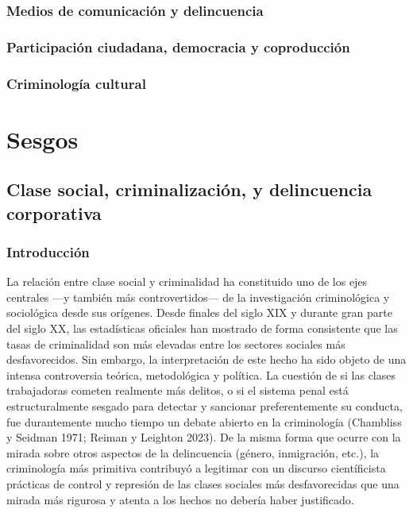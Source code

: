 \documentclass[
  spanish,
  letterpaper,
  DIV=11,
  numbers=noendperiod]{scrreprt}
\begin{document}
\section{Medios de comunicación y
delincuencia}\label{medios-de-comunicaciuxf3n-y-delincuencia}

\section{Participación ciudadana, democracia y
coproducción}\label{participaciuxf3n-ciudadana-democracia-y-coproducciuxf3n}

\section{Criminología cultural}\label{criminologuxeda-cultural}

\part{Sesgos}

\chapter{Clase social, criminalización, y delincuencia
corporativa}\label{clase-social-criminalizaciuxf3n-y-delincuencia-corporativa}

\section{Introducción}\label{introducciuxf3n-1}

La relación entre clase social y criminalidad ha constituido uno de los
ejes centrales ---y también más controvertidos--- de la investigación
criminológica y sociológica desde sus orígenes. Desde finales del siglo
XIX y durante gran parte del siglo XX, las estadísticas oficiales han
mostrado de forma consistente que las tasas de criminalidad son más
elevadas entre los sectores sociales más desfavorecidos. Sin embargo, la
interpretación de este hecho ha sido objeto de una intensa controversia
teórica, metodológica y política. La cuestión de si las clases
trabajadoras cometen realmente más delitos, o si el sistema penal está
estructuralmente sesgado para detectar y sancionar preferentemente su
conducta, fue durantemente mucho tiempo un debate abierto en la
criminología (Chambliss y Seidman 1971; Reiman y Leighton 2023). De la
misma forma que ocurre con la mirada sobre otros aspectos de la
delincuencia (género, inmigración, etc.), la criminología más primitiva
contribuyó a legitimar con un discurso científicista prácticas de
control y represión de las clases sociales más desfavorecidas que una
mirada más rigurosa y atenta a los hechos no debería haber justificado.
\end{document}
